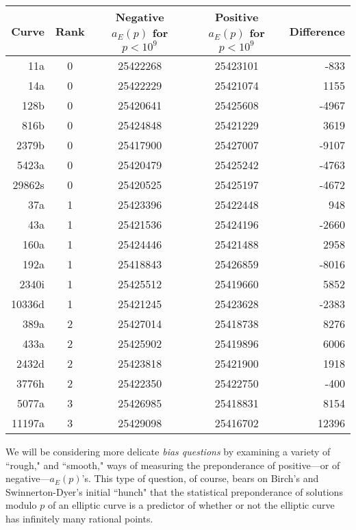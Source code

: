 \documentclass[11pt]{article}
\theoremstyle{plain}
\theoremstyle{definition}
\numberwithin{equation}{section}
\numberwithin{figure}{section}
\numberwithin{table}{section}
\begin{document}
\begin{center}
\begin{tabular} {r | c | c | c | r}\hline
Curve & Rank & Negative $a_E(p)$ for $p<10^9$ & Positive $a_E(p)$ for $p<10^9$ & Difference\\ \hline\hline
11a    & 0      & 25422268       & 25423101     &   -833 \\ \hline
14a    & 0      & 25422229       & 25421074     &   1155 \\ \hline
128b   & 0      & 25420641       & 25425608     &   -4967 \\ \hline
816b   & 0      & 25424848       & 25421229     &   3619 \\ \hline
2379b  & 0      & 25417900       & 25427007     &   -9107 \\ \hline
5423a  & 0      & 25420479       & 25425242     &   -4763 \\ \hline
29862s & 0      & 25420525       & 25425197     &   -4672 \\ \hline
37a    & 1      & 25423396       & 25422448     &   948 \\ \hline
43a    & 1      & 25421536       & 25424196     &   -2660 \\ \hline
160a   & 1      & 25424446       & 25421488     &   2958 \\ \hline
192a   & 1      & 25418843       & 25426859     &   -8016 \\ \hline
2340i  & 1      & 25425512       & 25419660     &   5852 \\ \hline
10336d & 1      & 25421245       & 25423628     &   -2383 \\ \hline
389a   & 2      & 25427014       & 25418738     &   8276 \\ \hline
433a   & 2      & 25425902       & 25419896     &   6006 \\ \hline
2432d  & 2      & 25423818       & 25421900     &   1918 \\ \hline
3776h  & 2      & 25422350       & 25422750     &   -400 \\ \hline
5077a  & 3      & 25426985       & 25418831     &   8154 \\ \hline
11197a & 3      & 25429098       & 25416702     &   12396 \\ \hline
\end{tabular}
\end{center}

We will be considering more delicate {\it bias questions} by examining a variety of ``rough," and ``smooth," ways of measuring  the preponderance of positive---or of negative---$a_E(p)$'s. This type of question, of course, bears on Birch's and  Swinnerton-Dyer's initial ``hunch" that the  statistical preponderance of solutions modulo $p$ of an elliptic curve is a predictor of whether or not the elliptic curve has infinitely many rational points.
\end{document}
